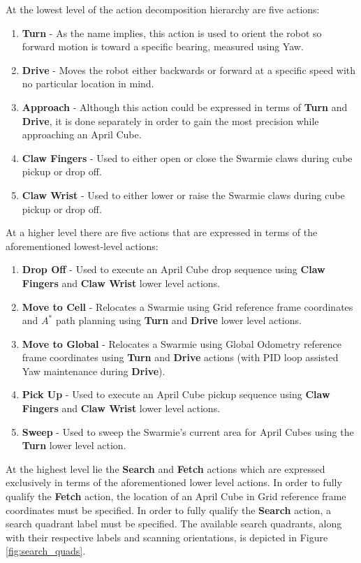 \documentclass[sigconf,authordraft]{acmart}
\begin{document}
At the lowest level of the action decomposition hierarchy are five actions:
\begin{enumerate}
  \item \textbf{Turn} - As the name implies, this action is used to orient the robot so forward motion is toward a specific bearing, measured using Yaw.
  \item \textbf{Drive} - Moves the robot either backwards or forward at a specific speed with no particular location in mind.
  \item \textbf{Approach} - Although this action could be expressed in terms of \textbf{Turn} and \textbf{Drive}, it is done separately in order to gain the most precision while approaching an April Cube.
  \item \textbf{Claw Fingers} - Used to either open or close the Swarmie claws during cube pickup or drop off.
  \item \textbf{Claw Wrist} - Used to either lower or raise the Swarmie claws during cube pickup or drop off.
\end{enumerate}

At a higher level there are five actions that are expressed in terms of the aforementioned lowest-level actions:
\begin{enumerate}
  \item \textbf{Drop Off} - Used to execute an April Cube drop sequence using \textbf{Claw Fingers} and \textbf{Claw Wrist} lower level actions.
  \item \textbf{Move to Cell} - Relocates a Swarmie using Grid reference frame coordinates and $A^*$ path planning using \textbf{Turn} and \textbf{Drive} lower level actions.
  \item \textbf{Move to Global} - Relocates a Swarmie using Global Odometry reference frame coordinates using \textbf{Turn} and \textbf{Drive} actions (with PID loop assisted Yaw maintenance during \textbf{Drive}).
  \item \textbf{Pick Up} - Used to execute an April Cube pickup sequence using \textbf{Claw Fingers} and \textbf{Claw Wrist} lower level actions.
  \item \textbf{Sweep} - Used to sweep the Swarmie's current area for April Cubes using the \textbf{Turn} lower level action.
\end{enumerate}

At the highest level lie the \textbf{Search} and \textbf{Fetch} actions which are expressed exclusively in terms of the aforementioned lower level actions. In order to fully qualify the \textbf{Fetch} action, the location of an April Cube in Grid reference frame coordinates must be specified. In order to fully qualify the \textbf{Search} action, a search quadrant label must be specified. The available search quadrants, along with their respective labels and scanning orientations, is depicted in Figure \ref{fig:search_quads}.
\end{document}
